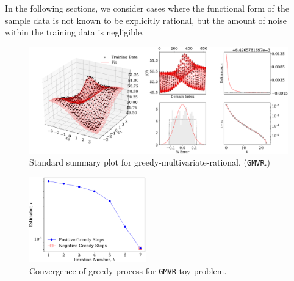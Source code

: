 \documentclass[twocolumn,aps,prd,floatfix,preprintnumbers,a4paper,nofootinbib,
superscriptaddress,10pt]{revtex4-1}
\def\gmvr#1{greedy-multivariate-rational#1
  (\texttt{GMVR}#1)\gdef\gmvr{\texttt{GMVR}}}
\begin{document}
%
In the following sections, we consider cases where the functional form of the sample data is not known to be explicitly rational, but the amount of noise within the training data is negligible.
%
%
\begin{figure}
  \includegraphics[width=\textwidth]{fig/issue3_summary.pdf}
	\caption{ Standard summary plot for \gmvr. }
  \label{fig:gmvrtoy}
\end{figure}


%
\begin{figure}[htb]
  \includegraphics[width=0.45\textwidth]{fig/issue3_pgreedy.pdf}
	\caption{ Convergence of greedy process for \gmvr{} toy problem. }
\end{figure}

%
\end{document}
